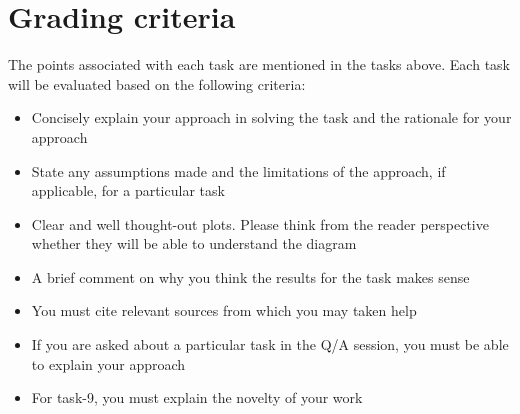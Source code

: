 \documentclass[a4paper, 11pt]{article}
\begin{document}
\section{Grading criteria}
The points associated with each task are mentioned in the tasks above. Each task will be evaluated based on the following criteria:
\begin{itemize}
	\item Concisely explain your approach in solving the task and the rationale for your approach
	\item State any assumptions made and the limitations of the approach, if applicable, for a particular task
	\item Clear and well thought-out plots. Please think from the reader perspective whether they will be able to understand the diagram
	\item A brief comment on why you think the results for the task makes sense
	\item You must cite relevant sources from which you may taken help 
	\item If you are asked about a particular task in the Q/A session, you must be able to explain your approach 
	\item For task-9, you must explain the novelty of your work
\end{itemize}

\end{document}
